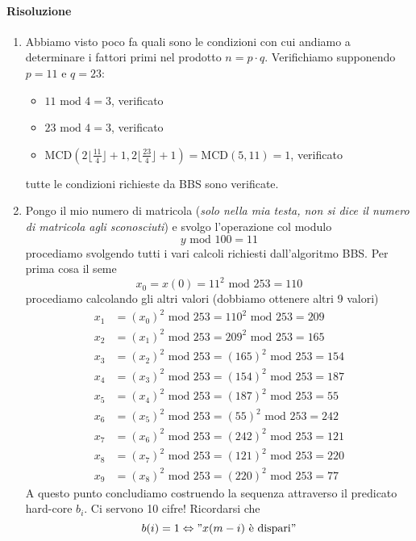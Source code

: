\begin{framed}
	\paragraph{Risoluzione}
	\begin{enumerate}
		\item Abbiamo visto poco fa quali sono le condizioni con cui andiamo a determinare i fattori primi nel prodotto $n=p \cdot q$. Verifichiamo supponendo $p=11$ e $q=23$:
		\begin{itemize}
			\item $11 \text{ mod } 4 = 3$, verificato
			\item $23 \text{ mod } 4 = 3$, verificato
			\item $\text{MCD}\left(2\lfloor\frac{11}{4}\rfloor+1, 2\lfloor\frac{23}{4}\rfloor+1\right)= \text{MCD}(5,11)=1$, verificato
		\end{itemize}
		tutte le condizioni richieste da BBS sono verificate.
		\item Pongo il mio numero di matricola (\emph{solo nella mia testa, non si dice il numero di matricola agli sconosciuti}) e svolgo l'operazione col modulo
		$$y \text{ mod } 100 = 11 $$
		procediamo svolgendo tutti i vari calcoli richiesti dall'algoritmo BBS. Per prima cosa il seme
		$$x_0=x(0)=11^2 \text{ mod } 253=110$$
		procediamo calcolando gli altri valori (dobbiamo ottenere altri 9 valori)
		\begin{align*}
			x_1&=(x_0)^2 \text{ mod } 253 = 110^2 \text{ mod } 253=209\\
			x_2&=(x_1)^2 \text{ mod } 253 = 209^2 \text{ mod } 253=165\\
			x_3&=(x_2)^2 \text{ mod } 253 =(165)^2 \text{ mod } 253=154\\
			x_4&=(x_3)^2 \text{ mod } 253 =(154)^2 \text{ mod } 253=187\\
			x_5&=(x_4)^2 \text{ mod } 253 =(187)^2 \text{ mod } 253=55\\
			x_6&=(x_5)^2 \text{ mod } 253 =(55)^2 \text{ mod } 253=242\\
			x_7&=(x_6)^2 \text{ mod } 253 =(242)^2 \text{ mod } 253=121\\
			x_8&=(x_7)^2 \text{ mod } 253 =(121)^2 \text{ mod } 253=220\\
			x_9&=(x_8)^2 \text{ mod } 253 = (220)^2 \text{ mod } 253=77
		\end{align*}
		A questo punto concludiamo costruendo la sequenza attraverso il predicato hard-core $b_i$. Ci servono 10 cifre! Ricordarsi che 
		$$b(i)=1 \Leftrightarrow "\text{$x(m-i)$ è dispari}"$$

\end{enumerate}
\end{framed}
